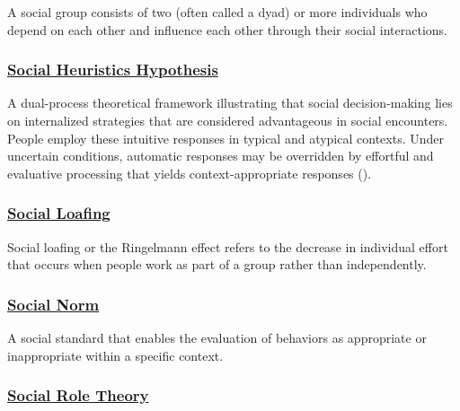 \documentclass[
  letterpaper,
]{book}
\begin{document}
A social group consists of two (often called a dyad) or more individuals
who depend on each other and influence each other through their social
interactions.

\subsubsection*{\texorpdfstring{\hyperref[def-socialheuristic]{Social
Heuristics
Hypothesis}}{Social Heuristics Hypothesis}}\label{social-heuristics-hypothesis-1}

A dual-process theoretical framework illustrating that social
decision-making lies on internalized strategies that are considered
advantageous in social encounters. People employ these intuitive
responses in typical and atypical contexts. Under uncertain conditions,
automatic responses may be overridden by effortful and evaluative
processing that yields context-appropriate responses
().

\subsubsection*{\texorpdfstring{\hyperref[def-socialloafing]{Social
Loafing}}{Social Loafing}}\label{social-loafing}

Social loafing or the Ringelmann effect refers to the decrease in
individual effort that occurs when people work as part of a group rather
than independently.

\subsubsection*{\texorpdfstring{\hyperref[def-socialnorm]{Social
Norm}}{Social Norm}}\label{social-norm}

A social standard that enables the evaluation of behaviors as
appropriate or inappropriate within a specific context.

\subsubsection*{\texorpdfstring{\hyperref[def-socialroletheory]{Social
Role Theory}}{Social Role Theory}}\label{social-role-theory}
\end{document}
